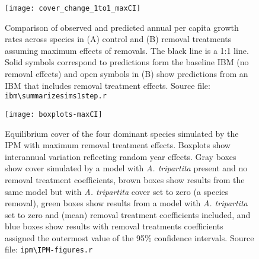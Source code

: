 \documentclass[11pt]{article}
\begin{document}
   \begin{figure}[tbp]
   \centering
   \texttt{[image: cover\_change\_1to1\_maxCI]}
   \caption{Comparison of observed and predicted annual per capita growth rates across species in (A) control and (B) removal treatments assuming maximum effects of removals. The black line is a 1:1 line. Solid symbols correspond to predictions form the baseline IBM (no removal effects) and open symbols in (B) show predictions from an IBM that includes removal treatment effects. Source file: \texttt{ibm\textbackslash summarize\textunderscore sims1step.r} }
   \label{fig:ObsPred1to1-maxCI}
   \end{figure}
 
  \begin{figure}[tbp]
  \centering
  \texttt{[image: boxplots-maxCI]}
  \caption{Equilibrium cover of the four dominant species simulated by the IPM with maximum removal treatment effects. Boxplots show interannual variation reflecting random year effects. Gray boxes show cover simulated by a model with \textit{A. tripartita} present and no removal treatment coefficients, brown boxes show results from the same model but with \textit{A. tripartita} cover set to zero (a species removal), green boxes show results from a model with  \textit{A. tripartita} set to zero and (mean) removal treatment coefficients included, and blue boxes show results with removal treatments coefficients assigned the outermost value of the 95\% confidence intervals.  Source file: \texttt{ipm\textbackslash IPM-figures.r}}
  \label{fig:IPMresults-maxCI}
  \end{figure}
\end{document}
